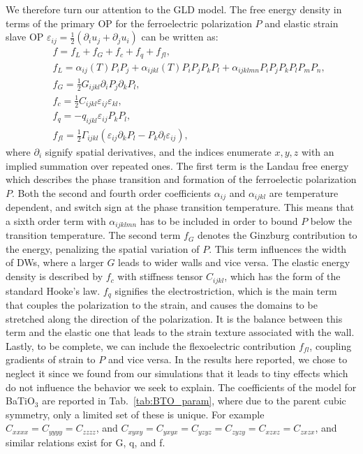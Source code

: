 We therefore turn our attention to the GLD model.
The free energy density in terms of the primary OP for the ferroelectric polarization $P$ and elastic strain slave OP $\varepsilon_{ij} = \frac{1}{2}(\partial_i u_j + \partial_j u_i)$ can be written as:
\begin{eqnarray}\label{eq:BTO_energy}
&&f = f_{L}+f_{G}+f_{c}+f_{q}+f_{fl},\\
&&f_{L} = \alpha_{ij}(T)P_iP_j + \alpha_{ijkl}(T)P_{i}P_{j}P_{k}P_{l} + \alpha_{ijklmn} P_i P_j P_k P_l P_m P_n,\\
&&f_{G} = \frac{1}{2}G_{ijkl}\partial_i P_j\partial_k P_l,\\
&&f_{c} = \frac{1}{2}C_{ijkl}\varepsilon_{ij}\varepsilon_{kl},\\
&&f_{q}= - q_{ijkl}\varepsilon_{ij}P_{k}P_{l},\\
&&f_{fl}=\frac{1}{2}\Gamma_{ijkl}(\varepsilon_{ij}\partial_k P_l - P_k\partial_l\varepsilon_{ij}),
\end{eqnarray}
where $\partial_i$ signify spatial derivatives, and the indices enumerate ${x,y,z}$ with an implied summation over repeated ones.
The first term is the Landau free energy which describes the phase transition and formation of the ferroelectic polarization $P$.
Both the second and fourth order coefficients $\alpha_{ij}$ and $\alpha_{ijkl}$ are temperature dependent, and switch sign at the phase transition temperature.
This means that a sixth order term with $\alpha_{ijklmn}$ has to be included in order to bound $P$ below the transition temperature.
The second term $f_G$ denotes the Ginzburg contribution to the energy, penalizing the spatial variation of $P$.  
This term influences the width of DWs, where a larger $G$ leads to wider walls and vice versa.
The elastic energy density is described by $f_c$ with stiffness tensor $C_{ijkl}$, which has the form of the standard Hooke's law.
$f_q$ signifies the electrostriction, which is the main term that couples the polarization to the strain, and causes the domains to be stretched along the direction of the polarization.
It is the balance between this term and the elastic one that leads to the strain texture associated with the wall.
Lastly, to be complete, we can include the flexoelectric contribution $f_{fl}$, coupling gradients of strain to $P$ and vice versa.
In the results here reported, we chose to neglect it since we found from our simulations that it leads to tiny effects which do not influence the behavior we seek to explain.
The coefficients of the model for BaTiO$_3$ are reported in Tab.~\ref{tab:BTO_param}, where due to the parent cubic symmetry, only a limited set of these is unique.
For example $C_{xxxx} = C_{yyyy} = C_{zzzz}$, and $C_{xyxy} = C_{yxyx} = C_{yzyz} = C_{zyzy} = C_{xzxz} = C_{zxzx}$, and similar relations exist for G, q, and f. 

